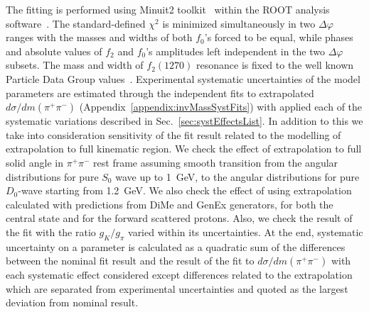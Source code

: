 The fitting is performed using Minuit2 toolkit~\cite{Minuit2} within the ROOT analysis software~\cite{ROOT}. The standard-defined $\chi^{2}$ is minimized simultaneously in two $\Delta\varphi$ ranges with the masses and widths of both $f_0$'s forced to be equal, while phases and absolute values of $f_2$ and $f_0$'s amplitudes left independent in the two $\Delta\varphi$ subsets. The mass and width of $f_2(1270)$ resonance is fixed to the well known Particle Data Group values~\cite{pdg}.
%
Experimental systematic uncertainties of the model parameters are estimated through the independent fits to extrapolated $d\sigma/dm(\pi^{+}\pi^{-})$ (Appendix~\ref{appendix:invMassSystFits}) with applied each of the systematic variations described in Sec.~\ref{sec:systEffectsList}. In addition to this we take into consideration sensitivity of the fit result related to the modelling of extrapolation to full kinematic region. We check the effect of extrapolation to full solid angle in $\pi^{+}\pi^{-}$ rest frame assuming smooth transition from the angular distributions for pure $S_{0}$ wave up to 1~GeV, to the angular distributions for pure $D_{0}$-wave starting from 1.2~GeV. We also check the effect of using extrapolation calculated with predictions from DiMe and GenEx generators, for both the central state and for the forward scattered protons. Also, we check the result of the fit with the ratio $g_{K}/g_{\pi}$ varied within its uncertainties.
At the end, systematic uncertainty on a parameter is calculated as a quadratic sum of the differences between the nominal fit result and the result of the fit to $d\sigma/dm(\pi^{+}\pi^{-})$ with each systematic effect considered except differences related to the extrapolation which are separated from experimental uncertainties and quoted as the largest deviation from nominal result.

